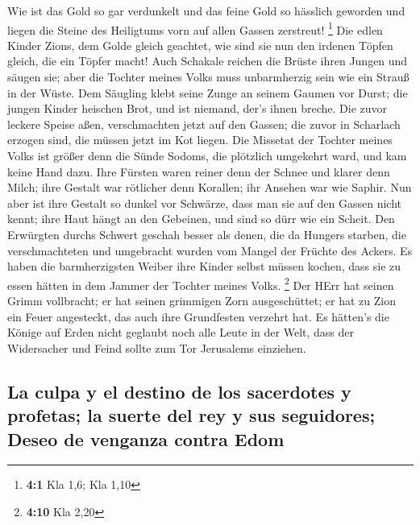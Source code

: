  Wie ist das Gold so gar verdunkelt und das feine Gold so
hässlich geworden und liegen die Steine des Heiligtums vorn auf allen
Gassen zerstreut! \footnote{\textbf{4:1} Kla 1,6; Kla 1,10}
 Die edlen Kinder Zions, dem Golde gleich geachtet, wie
sind sie nun den irdenen Töpfen gleich, die ein Töpfer macht!
 Auch Schakale reichen die Brüste ihren Jungen und säugen
sie; aber die Tochter meines Volks muss unbarmherzig sein wie ein Strauß
in der Wüste.  Dem Säugling klebt seine Zunge an seinem
Gaumen vor Durst; die jungen Kinder heischen Brot, und ist niemand,
der's ihnen breche.  Die zuvor leckere Speise aßen,
verschmachten jetzt auf den Gassen; die zuvor in Scharlach erzogen sind,
die müssen jetzt im Kot liegen.  Die Missetat der Tochter
meines Volks ist größer denn die Sünde Sodoms, die plötzlich umgekehrt
ward, und kam keine Hand dazu.  Ihre Fürsten waren reiner
denn der Schnee und klarer denn Milch; ihre Gestalt war rötlicher denn
Korallen; ihr Ansehen war wie Saphir.  Nun aber ist ihre
Gestalt so dunkel vor Schwärze, dass man sie auf den Gassen nicht kennt;
ihre Haut hängt an den Gebeinen, und sind so dürr wie ein Scheit.
 Den Erwürgten durchs Schwert geschah besser als denen,
die da Hungers starben, die verschmachteten und umgebracht wurden vom
Mangel der Früchte des Ackers.  Es haben die
barmherzigsten Weiber ihre Kinder selbst müssen kochen, dass sie zu
essen hätten in dem Jammer der Tochter meines Volks. \footnote{\textbf{4:10}
  Kla 2,20}  Der HErr hat seinen Grimm vollbracht; er hat
seinen grimmigen Zorn ausgeschüttet; er hat zu Zion ein Feuer
angesteckt, das auch ihre Grundfesten verzehrt hat.  Es
hätten's die Könige auf Erden nicht geglaubt noch alle Leute in der
Welt, dass der Widersacher und Feind sollte zum Tor Jerusalems
einziehen.

\hypertarget{la-culpa-y-el-destino-de-los-sacerdotes-y-profetas-la-suerte-del-rey-y-sus-seguidores-deseo-de-venganza-contra-edom}{%
\subsection{La culpa y el destino de los sacerdotes y profetas; la
suerte del rey y sus seguidores; Deseo de venganza contra
Edom}\label{la-culpa-y-el-destino-de-los-sacerdotes-y-profetas-la-suerte-del-rey-y-sus-seguidores-deseo-de-venganza-contra-edom}}

